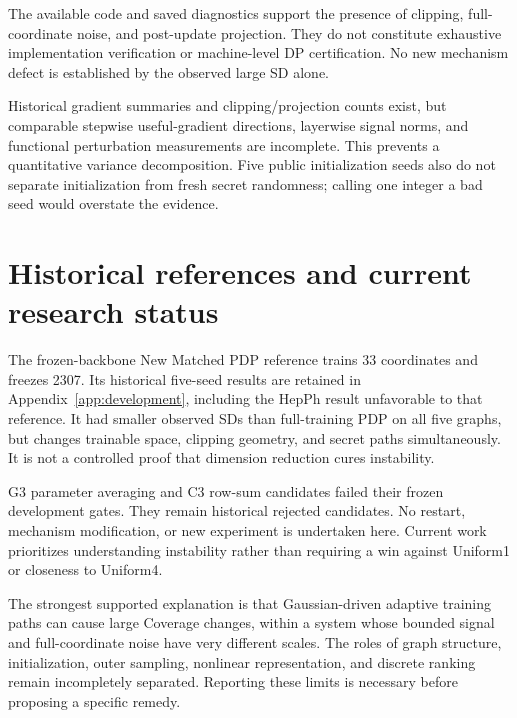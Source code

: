 The available code and saved diagnostics support the presence of clipping, full-coordinate noise, and post-update projection. They do not constitute exhaustive implementation verification or machine-level DP certification. No new mechanism defect is established by the observed large SD alone.

Historical gradient summaries and clipping/projection counts exist, but comparable stepwise useful-gradient directions, layerwise signal norms, and functional perturbation measurements are incomplete. This prevents a quantitative variance decomposition. Five public initialization seeds also do not separate initialization from fresh secret randomness; calling one integer a bad seed would overstate the evidence.

\section{Historical references and current research status}
The frozen-backbone New Matched PDP reference trains 33 coordinates and freezes 2307. Its historical five-seed results are retained in Appendix~\ref{app:development}, including the HepPh result unfavorable to that reference. It had smaller observed SDs than full-training PDP on all five graphs, but changes trainable space, clipping geometry, and secret paths simultaneously. It is not a controlled proof that dimension reduction cures instability.

G3 parameter averaging and C3 row-sum candidates failed their frozen development gates. They remain historical rejected candidates. No restart, mechanism modification, or new experiment is undertaken here. Current work prioritizes understanding instability rather than requiring a win against Uniform1 or closeness to Uniform4.

The strongest supported explanation is that Gaussian-driven adaptive training paths can cause large Coverage changes, within a system whose bounded signal and full-coordinate noise have very different scales. The roles of graph structure, initialization, outer sampling, nonlinear representation, and discrete ranking remain incompletely separated. Reporting these limits is necessary before proposing a specific remedy.
